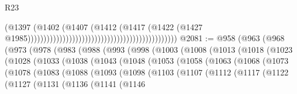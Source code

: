\begin{lexlean}{R23}
\begin{coremodule}
                                                                                    (@1397
                                                                                      (@1402
                                                                                        (@1407
                                                                                          (@1412
                                                                                            (@1417
                                                                                              (@1422
                                                                                                (@1427
                                                                                                  @1985)))))))))))))))))))))))))))))))))))))))))))))))
@2081 := @958
    (@963
      (@968
        (@973
          (@978
            (@983
              (@988
                (@993
                  (@998
                    (@1003
                      (@1008
                        (@1013
                          (@1018
                            (@1023
                              (@1028
                                (@1033
                                  (@1038
                                    (@1043
                                      (@1048
                                        (@1053
                                          (@1058
                                            (@1063
                                              (@1068
                                                (@1073
                                                  (@1078
                                                    (@1083
                                                      (@1088
                                                        (@1093
                                                          (@1098
                                                            (@1103
                                                              (@1107
                                                                (@1112
                                                                  (@1117
                                                                    (@1122
                                                                      (@1127
                                                                        (@1131
                                                                          (@1136
                                                                            (@1141
                                                                              (@1146

\end{coremodule}
\end{lexlean}

